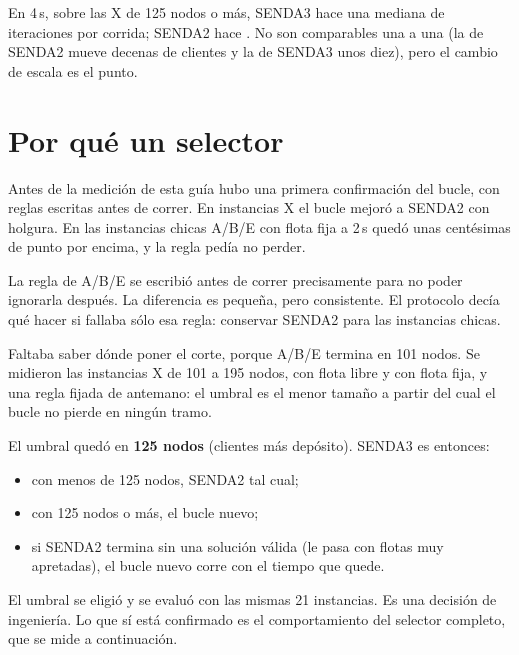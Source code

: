 \documentclass[11pt,a4paper]{article}
\newcommand{\sendados}{SENDA2}
\newcommand{\sendatres}{SENDA3}
\begin{document}
\begin{ideaclave}
En 4\,s, sobre las X de 125 nodos o más, \sendatres{} hace una mediana de \IterTres{} iteraciones por
corrida; \sendados{} hace \IterDos. No son comparables una a una (la de \sendados{} mueve decenas de
clientes y la de \sendatres{} unos diez), pero el cambio de escala es el punto.
\end{ideaclave}

\section{Por qué un selector}
\label{sec:selector}

Antes de la medición de esta guía hubo una primera confirmación del bucle, con reglas escritas antes de
correr. En instancias X el bucle mejoró a \sendados{} con holgura. En las instancias chicas A/B/E con
flota fija a 2\,s quedó unas centésimas de punto por encima, y la regla pedía no perder.

\begin{leccion}
La regla de A/B/E se escribió antes de correr precisamente para no poder ignorarla después. La
diferencia es pequeña, pero consistente. El protocolo decía qué hacer si fallaba sólo esa regla:
conservar \sendados{} para las instancias chicas.
\end{leccion}

Faltaba saber dónde poner el corte, porque A/B/E termina en 101 nodos. Se midieron las instancias X de
101 a 195 nodos, con flota libre y con flota fija, y una regla fijada de antemano: el umbral es el
menor tamaño a partir del cual el bucle no pierde en ningún tramo.

El umbral quedó en \textbf{125 nodos} (clientes más depósito). \sendatres{} es entonces:

\begin{itemize}[leftmargin=1.5em]
\item con menos de 125 nodos, \sendados{} tal cual;
\item con 125 nodos o más, el bucle nuevo;
\item si \sendados{} termina sin una solución válida (le pasa con flotas muy apretadas), el bucle
nuevo corre con el tiempo que quede.
\end{itemize}

El umbral se eligió y se evaluó con las mismas 21 instancias. Es una decisión de ingeniería. Lo que sí está confirmado es el
comportamiento del selector completo, que se mide a continuación.
\end{document}
